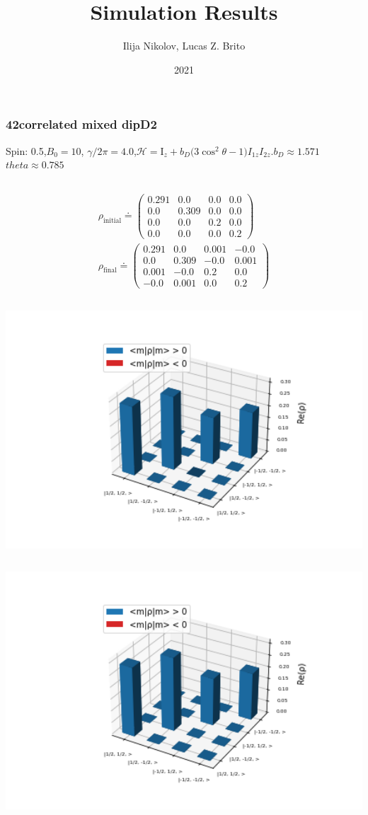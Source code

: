 \documentclass[10pt]{beamer}
\title{Simulation Results}
\author{Ilija Nikolov, Lucas Z. Brito}
\institute{}
\date{2021}
\begin{document}
\frame{\titlepage}
\begin{frame}
\frametitle{42correlated mixed dipD2}
Spin: 0.5,$B_0= 10$, $\gamma/2\pi = 4.0$,$\mathcal{H}=\text{I}_{z}+ b_D \big(3\cos^2\theta-1\big)I_{1z}I_{2z}.$$b_D\approx1.571$$theta\approx0.785$
\begin{columns}[T]
\begin{column}{.5\textwidth}
\begin{align*}
\rho_{\text{initial}}\doteq
\begin{pmatrix}
0.291 & 0.0 & 0.0 & 0.0 \\
0.0 & 0.309 & 0.0 & 0.0 \\
0.0 & 0.0 & 0.2 & 0.0 \\
0.0 & 0.0 & 0.0 & 0.2
\end{pmatrix}
\\
\rho_{\text{final}}\doteq
\begin{pmatrix}
0.291 & 0.0 & 0.001 & -0.0 \\
0.0 & 0.309 & -0.0 & 0.001 \\
0.001 & -0.0 & 0.2 & 0.0 \\
-0.0 & 0.001 & 0.0 & 0.2
\end{pmatrix}
\end{align*}
\begin{column}{.5\textwidth}
\includegraphics[width=1.5\textwidth]{./spin1-2/42correlated_mixed_dipD2/InitialRealPartDensityMatrix.png}
\end{column}
\begin{column}{.5\textwidth}
\includegraphics[width=1.5\textwidth]{./spin1-2/42correlated_mixed_dipD2/EvolvedRealPartDensityMatrix.png}

\end{column}
\end{column}
\end{columns}
\end{frame}
\end{document}
